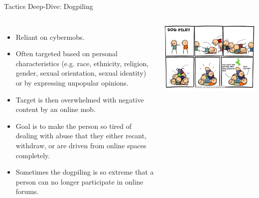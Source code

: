 \documentclass[nobackground,dvipsnames,table,aspectratio=169]{beamer}
\begin{document}
\begin{frame}{Tactics Deep-Dive: Dogpiling}
    \begin{columns}[T]
            \scriptsize
            \begin{itemize}
                \item Reliant on cybermobs.
                \item Often targeted based on personal characteristics (e.g. race, ethnicity, religion, gender, sexual orientation, sexual identity) or by expressing unpopular opinions.
                \item Target is then overwhelmed with negative content by an online mob.
                \item Goal is to make the person so tired of dealing with abuse that they either recant, withdraw, or are driven from online spaces completely.
                \item Sometimes the dogpiling is so extreme that a person can no longer participate in online forums.
            \end{itemize}
            \includegraphics[width=\textwidth]{dogpile-cyanide-and-happiness}
    \end{columns}
\end{frame}
\end{document}
